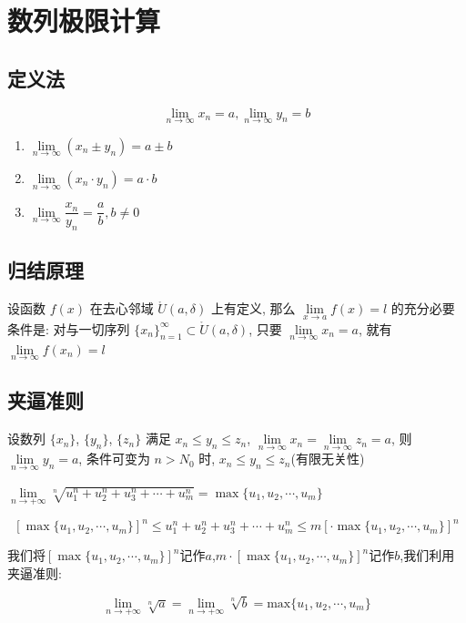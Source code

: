 \section{数列极限计算}
\subsection{定义法}
\begin{definition}[极限的四则运算]
	$$\lim\limits_{n\to \infty}x_{n}=a,\lim\limits_{n\to \infty}y_{n}=b$$
	\begin{enumerate}
		\item $\lim\limits_{n\to \infty}(x_{n}\pm y_{n}) = a\pm b$
		\item $\lim\limits_{n\to \infty}(x_{n}\cdot y_{n}) = a\cdot b$
		\item $\lim\limits_{n\to \infty}\dfrac{x_{n}}{y_{n}} = \dfrac{a}{b}, b\neq 0$
	\end{enumerate}

\end{definition}
\subsection{归结原理}
\begin{definition}[归结原理]
	设函数 $f(x)$ 在去心邻域 $\mathring{U}(a,\delta)$ 上有定义, 那么 $\lim\limits_{x\to a}f(x) = l$ 的充分必要条件是: 对与一切序列 $\{x_{n}\}_{n=1}^{\infty}\subset \mathring{U}(a,\delta)$, 只要 $\lim\limits_{n\to\infty}x_{n}=a$, 就有 $\lim\limits_{n\to\infty}f(x_{n})=l$
\end{definition}
\subsection{夹逼准则}
\begin{definition}[夹逼准则]
	设数列 $\{x_{n}\}$, $\{y_{n}\}$, $\{z_{n}\}$ 满足 $x_{n}\leq y_{n}\leq z_{n}$, $\lim\limits_{n\to\infty}x_{n}=\lim\limits_{n\to\infty}z_{n}=a$, 则 $\lim\limits_{n\to\infty}y_{n}=a$, 条件可变为 $n>N_{0}$ 时, $x_{n}\leq y_{n}\leq z_{n}$(有限无关性)
\end{definition}

\begin{corollary}[夹逼准则]
	$\lim\limits_{n\rightarrow +\infty}\sqrt[n]{u_{1}^{n}+u_{2}^{n}+u_{3}^{n}+\cdots+u_{m}^{n}}=\max\{ u_{1},u_{2},\cdots,u_{m}\}$
	\begin{anymark}[证明]
		$$[\max\{ u_{1},u_{2},\cdots,u_{m}\}]^{n}\leq u_{1}^{n}+u_{2}^{n}+u_{3}^{n}+\cdots+u_{m}^{n}\leq m[\cdot\max\{ u_{1},u_{2},\cdots,u_{m}\}]^{n}$$
	
		我们将$[\max\{ u_{1},u_{2},\cdots,u_{m}\}]^{n}$记作$a$,$m\cdot[\max\{ u_{1},u_{2},\cdots,u_{m}\}]^{n}$记作$b$,我们利用夹逼准则:

	$$\lim\limits_{n\rightarrow +\infty}\sqrt[n]{a}=\lim\limits_{n\rightarrow +\infty}\sqrt[n]{b}=\text{max}\{ u_{1},u_{2},\cdots,u_{m}\}$$
	\end{anymark}
\end{corollary}

